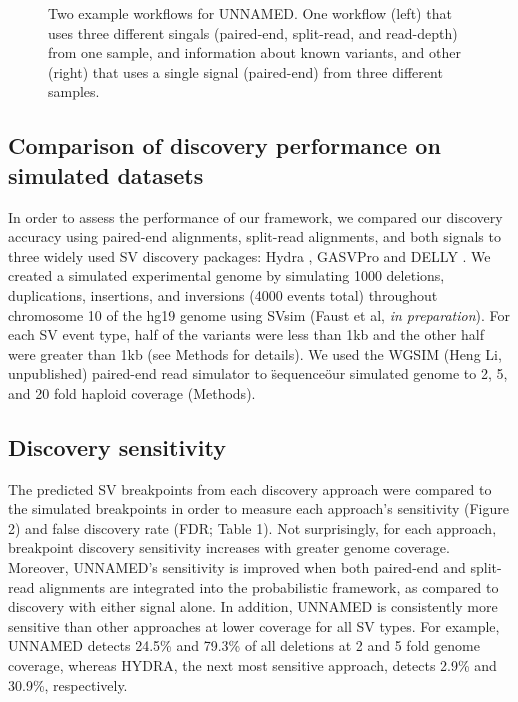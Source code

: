 \documentclass[11pt]{article}
\begin{document}
\begin{figure}
\caption{Two example workflows for UNNAMED. One workflow (left) that uses three
different singals (paired-end, split-read, and read-depth) from one sample, and
information about known variants, and other (right) that uses a single signal
(paired-end) from three different samples.}
\label{workflow:fig}
\end{figure}

\subsection{Comparison of discovery performance on simulated datasets}
In order to assess the performance of our framework, we compared our discovery
accuracy using paired-end alignments, split-read alignments, and both signals to 
three widely used SV discovery packages: Hydra \cite{quinlan2010b},
GASVPro \cite{sindi2012} and DELLY \cite{rausch2012b}. We created a simulated 
experimental genome by simulating 1000 deletions, duplications, insertions, 
and inversions (4000 events total) throughout chromosome 10 of the hg19 genome 
using SVsim (Faust et al, \emph{in preparation}).  For each SV event type, half
of the variants were less than 1kb and the other half were greater than 1kb (see
Methods for details).  We used the WGSIM (Heng Li, unpublished) paired-end read 
simulator to \"sequence\" our simulated genome to 2, 5, and 20 fold 
haploid coverage (Methods).

\subsection{Discovery sensitivity}
The predicted SV breakpoints from each discovery approach were compared to the
simulated breakpoints in order to measure each approach's sensitivity (Figure 2) 
and false discovery rate (FDR; Table 1). Not surprisingly, for each approach,
breakpoint discovery sensitivity increases with greater genome coverage.
Moreover, UNNAMED's sensitivity is improved when both paired-end and split-read
alignments are integrated into the probabilistic framework, as compared to 
discovery with either signal alone. In addition, UNNAMED is consistently more
sensitive than other approaches at lower coverage for all SV types. For example,
UNNAMED detects 24.5\% and 79.3\% of all deletions at 2 and 5 fold genome
coverage, whereas HYDRA, the next most sensitive approach, detects 2.9\% and
30.9\%, respectively. 
\end{document}
